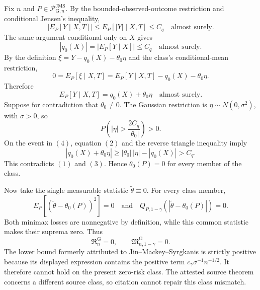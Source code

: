 Fix \(n\) and \(P\in\mathcal P_{\mathrm G,n}^{\mathrm{JMS}}\).  By the bounded-observed-outcome restriction and conditional Jensen's inequality,
\[
 \left|E_P[Y\mid X,T]\right|
 \le E_P[|Y|\mid X,T]
 \le C_q
 \quad\text{almost surely}. \tag{1}
\]
The same argument conditional only on \(X\) gives
\[
 |q_0(X)|=|E_P[Y\mid X]|
 \le C_q
 \quad\text{almost surely}. \tag{2}
\]
By the definition
\(
 \xi=Y-q_0(X)-\theta_0\eta
\)
and the class's conditional-mean restriction,
\[
 0=E_P[\xi\mid X,T]
  =E_P[Y\mid X,T]-q_0(X)-\theta_0\eta.
\]
Therefore
\[
 E_P[Y\mid X,T]=q_0(X)+\theta_0\eta
 \quad\text{almost surely}. \tag{3}
\]
Suppose for contradiction that \(\theta_0\ne0\).  The Gaussian restriction is \(\eta\sim N(0,\sigma^2)\), with \(\sigma>0\), so
\[
 P\!\left(|\eta|>\frac{2C_q}{|\theta_0|}\right)>0. \tag{4}
\]
On the event in \((4)\), equation \((2)\) and the reverse triangle inequality imply
\[
 |q_0(X)+\theta_0\eta|
 \ge |\theta_0|\,|\eta|-|q_0(X)|
 >C_q.
\]
This contradicts \((1)\) and \((3)\).  Hence \(\theta_0(P)=0\) for every member of the class.

Now take the single measurable statistic \(\widetilde\theta\equiv0\).  For every class member,
\[
 E_P[(\widetilde\theta-\theta_0(P))^2]=0
 \quad\text{and}\quad
 Q_{P,1-\gamma}(|\widetilde\theta-\theta_0(P)|)=0.
\]
Both minimax losses are nonnegative by definition, while this common statistic makes their suprema zero.  Thus
\[
 \mathfrak R_n^{\mathrm G}=0,
 \qquad
 \mathfrak M_{n,1-\gamma}^{\mathrm G}=0.
\]
The lower bound formerly attributed to Jin--Mackey--Syrgkanis is strictly positive because its displayed expression contains the positive term \(c_\gamma\sigma^{-1}n^{-1/2}\).  It therefore cannot hold on the present zero-risk class.  The attested source theorem concerns a different source class, so citation cannot repair this class mismatch.